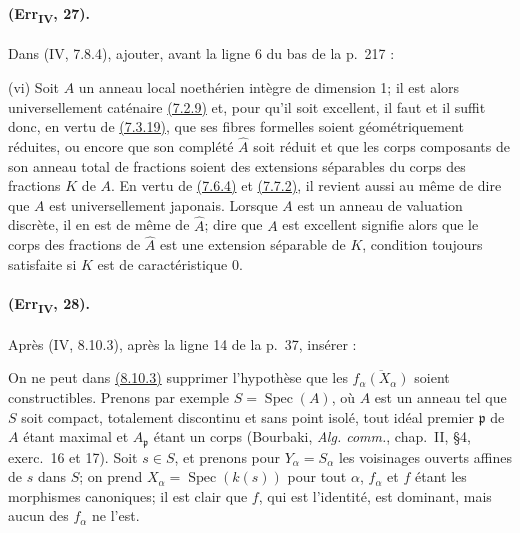 \paragraph{(Err\textsubscript{IV}, 27).}
Dans (IV, 7.8.4), ajouter, avant la ligne 6 du bas de la p.~217 :

\smallskip
\noindent
\textup{(vi)} Soit $A$ un anneau local noethérien intègre de dimension
1; il est alors universellement caténaire
{\hyperref[canon-index.ega4.c04.cor.7-2-9]{(7.2.9)}} et, pour qu'il soit excellent,
il faut et il suffit donc, en vertu de
{\hyperref[canon-index.ega4.c04.statement.7-3-19]{(7.3.19)}}, que ses fibres
formelles soient géométriquement réduites, ou encore que son complété
$\widehat A$ soit réduit et que les corps composants de son anneau total
de fractions soient des extensions séparables du corps des fractions
$K$ de $A$. En vertu de {\hyperref[canon-index.ega4.c04.thm.7-6-4]{(7.6.4)}} et
{\hyperref[canon-index.ega4.c04.thm.7-7-2]{(7.7.2)}}, il revient aussi au même de
dire que $A$ est universellement japonais. Lorsque $A$ est un anneau de
valuation discrète, il en est de même de $\widehat A$; dire que $A$ est
excellent signifie alors que le corps des fractions de $\widehat A$
est une extension séparable de $K$, condition toujours satisfaite si
$K$ est de caractéristique 0.

\paragraph{(Err\textsubscript{IV}, 28).}
Après (IV, 8.10.3), après la ligne 14 de la p.~37, insérer :

\begin{remark}[8.10.3.1]
\label{IV.8.10.3.1}
On ne peut dans {\hyperref[canon-index.ega4.c04.prop.8-10-3]{(8.10.3)}} supprimer
l'hypothèse que les $\overline{f_\alpha(X_\alpha)}$ soient
constructibles. Prenons par exemple $S=\operatorname{Spec}(A)$, où $A$
est un anneau tel que $S$ soit compact, totalement discontinu et sans
point isolé, tout idéal premier $\mathfrak p$ de $A$ étant maximal et
$A_\mathfrak p$ étant un corps (Bourbaki, \emph{Alg. comm.}, chap.~II,
\S4, exerc.~16 et 17). Soit $s\in S$, et prenons pour
$Y_\alpha=S_\alpha$ les voisinages ouverts affines de $s$ dans $S$; on
prend $X_\alpha=\operatorname{Spec}(k(s))$ pour tout $\alpha$,
$f_\alpha$ et $f$ étant les morphismes canoniques; il est clair que
$f$, qui est l'identité, est dominant, mais aucun des $f_\alpha$ ne
l'est.
\end{remark}

